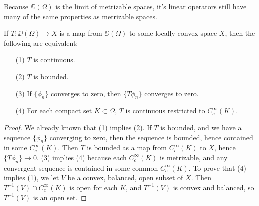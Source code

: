 Because $\DD(\Omega)$ is the limit of metrizable spaces, it's linear operators still have many of the same properties as metrizable spaces.

\begin{theorem}
    If $T: \DD(\Omega) \to X$ is a map from $\DD(\Omega)$ to some locally convex space $X$, then the following are equivalent:
    \begin{itemize}
        \item[(1)] $T$ is continuous.
        \item[(2)] $T$ is bounded.
        \item[(3)] If $\{ \phi_n \}$ converges to zero, then $\{ T\phi_n \}$ converges to zero.
        \item[(4)] For each compact set $K \subset \Omega$, $T$ is continuous restricted to $C_c^\infty(K)$.
    \end{itemize}
\end{theorem}
\begin{proof}
    We already known that (1) implies (2). If $T$ is bounded, and we have a sequence $\{ \phi_n \}$ converging to zero, then the sequence is bounded, hence contained in some $C_c^\infty(K)$. Then $T$ is bounded as a map from $C_c^\infty(K)$ to $X$, hence $\{ T\phi_n \} \to 0$. (3) implies (4) because each $C_c^\infty(K)$ is metrizable, and any convergent sequence is contained in some common $C_c^\infty(K)$. To prove that (4) implies (1), we let $V$ be a convex, balanced, open subset of $X$. Then $T^{-1}(V) \cap C_c^\infty(K)$ is open for each $K$, and $T^{-1}(V)$ is convex and balanced, so $T^{-1}(V)$ is an open set.
\end{proof}


